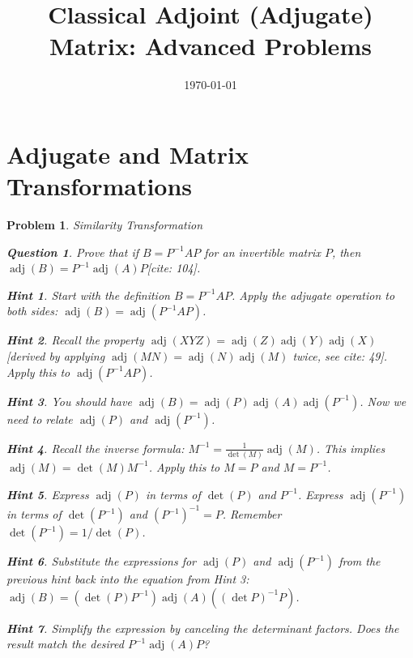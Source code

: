 \documentclass[12pt]{article}
\title{Classical Adjoint (Adjugate) Matrix: Advanced Problems}
\author{}
\date{\today}
\newtheorem{problem}{Problem}[section]
\newtheorem{question}{Question}[problem]
\theoremstyle{definition}
\newtheorem{hint}{Hint}[question]
\newcommand{\adj}{\operatorname{adj}}
\newcommand{\detm}{\operatorname{det}}
\begin{document}
\maketitle

\section{Adjugate and Matrix Transformations}

\begin{problem}{Similarity Transformation}
    \begin{question}
        Prove that if $B = P^{-1} A P$ for an invertible matrix $P$, then $\adj(B) = P^{-1} \adj(A) P$[cite: 104].
    \end{question}
    \begin{hint}
        Start with the definition $B = P^{-1} A P$. Apply the adjugate operation to both sides: $\adj(B) = \adj(P^{-1} A P)$.
    \end{hint}
    \begin{hint}
        Recall the property $\adj(XYZ) = \adj(Z) \adj(Y) \adj(X)$ [derived by applying $\adj(MN)=\adj(N)\adj(M)$ twice, see cite: 49]. Apply this to $\adj(P^{-1} A P)$.
    \end{hint}
    \begin{hint}
        You should have $\adj(B) = \adj(P) \adj(A) \adj(P^{-1})$. Now we need to relate $\adj(P)$ and $\adj(P^{-1})$.
    \end{hint}
    \begin{hint}
        Recall the inverse formula: $M^{-1} = \frac{1}{\detm(M)} \adj(M)$. This implies $\adj(M) = \detm(M) M^{-1}$. Apply this to $M=P$ and $M=P^{-1}$.
    \end{hint}
    \begin{hint}
        Express $\adj(P)$ in terms of $\detm(P)$ and $P^{-1}$. Express $\adj(P^{-1})$ in terms of $\detm(P^{-1})$ and $(P^{-1})^{-1} = P$. Remember $\detm(P^{-1}) = 1/\detm(P)$.
    \end{hint}
    \begin{hint}
        Substitute the expressions for $\adj(P)$ and $\adj(P^{-1})$ from the previous hint back into the equation from Hint 3: $\adj(B) = (\detm(P) P^{-1}) \adj(A) ((\detm P)^{-1} P)$.
    \end{hint}
    \begin{hint}
        Simplify the expression by canceling the determinant factors. Does the result match the desired $P^{-1} \adj(A) P$?
    \end{hint}
\end{problem}
\end{document}

